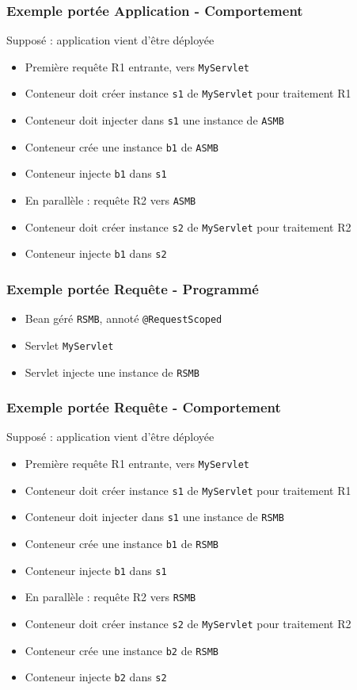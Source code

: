 \documentclass[english, french]{beamer}
\begin{document}
\begin{frame}
	\frametitle{Exemple portée Application - Comportement}
	Supposé : application vient d’être déployée
	\begin{itemize}
		\item Première requête R1 entrante, vers \texttt{MyServlet}
		\item \pause Conteneur doit créer instance \texttt{s1} de \texttt{MyServlet} pour traitement R1
		\item \pause Conteneur doit injecter dans \texttt{s1} une instance de \texttt{ASMB}
		\item \pause Conteneur crée une instance \texttt{b1} de \texttt{ASMB}
		\item \pause Conteneur injecte \texttt{b1} dans \texttt{s1} 
		\item En parallèle : requête R2 vers \texttt{ASMB}
		\item \pause Conteneur doit créer instance \texttt{s2} de \texttt{MyServlet} pour traitement R2
		\item \pause Conteneur injecte \texttt{b1} dans \texttt{s2}
	\end{itemize}
\end{frame}

\begin{frame}
	\frametitle{Exemple portée Requête - Programmé}
	\begin{itemize}
		\item Bean géré \texttt{RSMB}, annoté \texttt{@RequestScoped}
		\item Servlet \texttt{MyServlet}
		\item Servlet injecte une instance de \texttt{RSMB}
	\end{itemize}
\end{frame}

\begin{frame}
	\frametitle{Exemple portée Requête - Comportement}
	Supposé : application vient d’être déployée
	\begin{itemize}
		\item Première requête R1 entrante, vers \texttt{MyServlet}
		\item \pause Conteneur doit créer instance \texttt{s1} de \texttt{MyServlet} pour traitement R1
		\item \pause Conteneur doit injecter dans \texttt{s1} une instance de \texttt{RSMB}
		\item \pause Conteneur crée une instance \texttt{b1} de \texttt{RSMB}
		\item \pause Conteneur injecte \texttt{b1} dans \texttt{s1} 
		\item En parallèle : requête R2 vers \texttt{RSMB}
		\item \pause Conteneur doit créer instance \texttt{s2} de \texttt{MyServlet} pour traitement R2
		\item \pause Conteneur crée une instance \texttt{b2} de \texttt{RSMB}
		\item \pause Conteneur injecte \texttt{b2} dans \texttt{s2}
	\end{itemize}
\end{frame}
\end{document}
